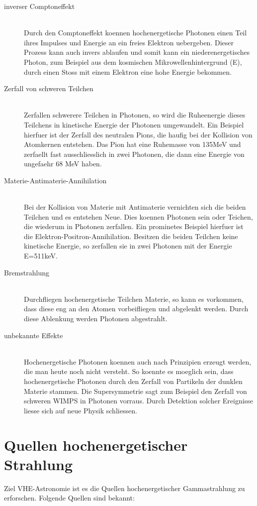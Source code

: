 \begin{description}
\item[inverser Comptoneffekt]\hfill \\
Durch den Comptoneffekt koennen hochenergetische Photonen einen Teil ihres Impulses und Energie an ein freies Elektron uebergeben. Dieser Prozess kann auch invers ablaufen und somit kann ein niederenergetisches Photon, zum Beispiel aus dem kosmischen Mikrowellenhintergrund (E), durch einen Stoss mit einem Elektron eine hohe Energie bekommen.
\item[Zerfall von schweren Teilchen]\hfill \\ 
Zerfallen schwerere Teilchen in Photonen, so wird die Ruheenergie dieses Teilchens in kinetische Energie der Photonen umgewandelt. Ein Beispiel hierfuer ist der Zerfall des neutralen Pions, die haufig bei der Kollision von Atomkernen entstehen. Das Pion hat eine Ruhemasse von 135MeV 
und zerfaellt fast ausschliesslich in zwei Photonen, die dann eine Energie von ungefaehr 68 MeV haben.
\item[Materie-Antimaterie-Annihilation]\hfill \\
Bei der Kollision von Materie mit Antimaterie vernichten sich die beiden Teilchen und es entstehen Neue. Dies koennen Photonen sein oder Teichen, die wiederum in Photonen zerfallen. Ein prominetes Beispiel hierfuer ist die Elektron-Positron-Annihilation. Besitzen die beiden Teilchen keine kinetische Energie, so zerfallen sie in zwei Photonen mit der Energie E=511keV.
\item[Bremstrahlung]\hfill \\
Durchfliegen hochenergetische Teilchen Materie, so kann es vorkommen, dass diese eng an den Atomen vorbeifliegen und abgelenkt werden. Durch diese Ablenkung werden Photonen abgestrahlt.
\item[unbekannte Effekte]\hfill \\
Hochenergetische Photonen koennen auch nach Prinzipien erzeugt werden, die man heute noch nicht versteht. So koennte es moeglich sein, dass hochenergetische Photonen durch den Zerfall von Partikeln der dunklen Materie stammen. Die Supersymmetrie sagt zum Beispiel den Zerfall von schweren WIMPS in Photonen vorraus. Durch Detektion solcher Ereignisse liesse sich auf neue Physik schliessen.
\end{description}

\section{Quellen hochenergetischer Strahlung}
Ziel VHE-Astronomie ist es die Quellen hochenergetischer Gammastrahlung zu erforschen. Folgende Quellen sind bekannt:

